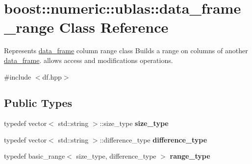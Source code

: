 \hypertarget{classboost_1_1numeric_1_1ublas_1_1data__frame__range}{}\section{boost\+:\+:numeric\+:\+:ublas\+:\+:data\+\_\+frame\+\_\+range Class Reference}
\label{classboost_1_1numeric_1_1ublas_1_1data__frame__range}


Represents \hyperlink{classboost_1_1numeric_1_1ublas_1_1data__frame}{data\+\_\+frame} column range class Builds a range on columns of another \hyperlink{classboost_1_1numeric_1_1ublas_1_1data__frame}{data\+\_\+frame}. allows access and modifications operations.  




{\ttfamily \#include $<$df.\+hpp$>$}

\subsection*{Public Types}
\begin{DoxyCompactItemize}
\item 
typedef vector$<$ std\+::string $>$\+::size\+\_\+type {\bfseries size\+\_\+type}\hypertarget{classboost_1_1numeric_1_1ublas_1_1data__frame__range_a14a4584e296fdfc9d8c2accd6e27ba01}{}\label{classboost_1_1numeric_1_1ublas_1_1data__frame__range_a14a4584e296fdfc9d8c2accd6e27ba01}

\item 
typedef vector$<$ std\+::string $>$\+::difference\+\_\+type {\bfseries difference\+\_\+type}\hypertarget{classboost_1_1numeric_1_1ublas_1_1data__frame__range_acb334affe8ebaa8fb9e59296c77072a3}{}\label{classboost_1_1numeric_1_1ublas_1_1data__frame__range_acb334affe8ebaa8fb9e59296c77072a3}

\item 
typedef basic\+\_\+range$<$ size\+\_\+type, difference\+\_\+type $>$ {\bfseries range\+\_\+type}\hypertarget{classboost_1_1numeric_1_1ublas_1_1data__frame__range_ac63cd34d67e118765217538d59076bf3}{}\label{classboost_1_1numeric_1_1ublas_1_1data__frame__range_ac63cd34d67e118765217538d59076bf3}

\end{DoxyCompactItemize}
